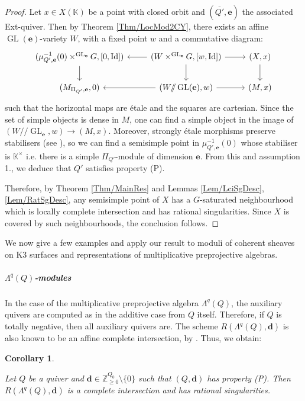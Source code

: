 \documentclass[11pt,english]{article}
\numberwithin{equation}{section}
\numberwithin{figure}{section}
\theoremstyle{definition}
\theoremstyle{plain}
\newtheorem{cor}[df]{Corollary}
\theoremstyle{remark}
\DeclareMathOperator{\Id}{Id}
\DeclareMathOperator{\GL}{GL}
\newcommand\dd{\mathbf{d}}
\newcommand\ee{\mathbf{e}}
\newcommand\KK{\mathbb{K}}
\newcommand\git{/\!\!/}
\begin{document}
\begin{proof}

Let $x\in X(\KK)$ be a point with closed orbit and $(\overline{Q'},\ee)$
the associated Ext-quiver. Then by Theorem \ref{Thm/LocMod2CY}, there
exists an affine $\GL(\ee)$-variety $W$, with a fixed point $w$
and a commutative diagram:\[
\begin{tikzcd}[ampersand replacement = \&]
(\mu_{Q',\ee}^{-1}(0)\times^{\GL_{\ee}}G,[0,\Id]) \ar[d] \& (W\times^{\GL_{\ee}}G,[w,\Id]) \ar[l]\ar[r]\ar[d] \& (X,x) \ar[d] \\
(M_{\Pi_{Q'},\ee},0) \& (W\git\GL(\ee),w) \ar[l]\ar[r] \& (M,x)
\end{tikzcd}
\]such that the horizontal maps are étale and the squares are cartesian.
Since the set of simple objects is dense in $M$, one can find a simple
object in the image of $(W\git\GL_{\ee},w)\rightarrow(M,x)$. Moreover,
strongly étale morphisms preserve stabilisers (see \cite[Lem. 2.6.]{Bud21}),
so we can find a semisimple point in $\mu_{Q',\ee}^{-1}(0)$ whose
stabiliser is $\KK^{\times}$ i.e. there is a simple $\Pi_{Q'}$-module
of dimension $\ee$. From this and assumption 1., we deduce that $Q'$
satisfies property (P).

Therefore, by Theorem \ref{Thm/MainRes} and Lemmas \ref{Lem/LciSgDesc},
\ref{Lem/RatSgDesc}, any semisimple point of $X$ has a $G$-saturated
neighbourhood which is locally complete intersection and has rational
singularities. Since $X$ is covered by such neighbourhoods, the conclusion
follows. \end{proof}

We now give a few examples and apply our result to moduli of coherent
sheaves on K3 surfaces and representations of multiplicative preprojective
algebras.

\subparagraph*{$\Lambda^{q}(Q)$-modules}

In the case of the multiplicative preprojective algebra $\Lambda^{q}(Q)$,
the auxiliary quivers are computed as in the additive case from $Q$
itself. Therefore, if $Q$ is totally negative, then all auxiliary
quivers are. The scheme $R(\Lambda^{q}(Q),\dd)$ is also known to
be an affine complete intersection, by \cite[Thm. 1.11.]{CBS06}.
Thus, we obtain:

\begin{cor} \label{Cor/RatSgMultPreproj}

Let $Q$ be a quiver and $\dd\in\mathbb{Z}_{\geq0}^{Q_{0}}\setminus\{0\}$
such that $(Q,\dd)$ has property (P). Then $R(\Lambda^{q}(Q),\dd)$
is a complete intersection and has rational singularities.

\end{cor}
\end{document}
